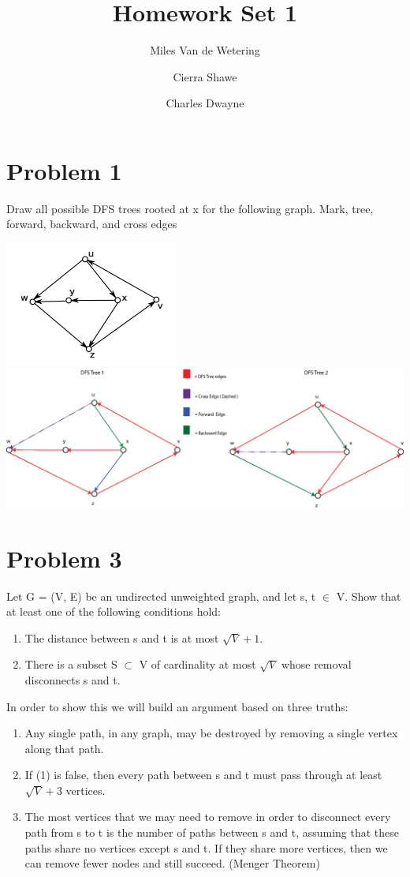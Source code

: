 \documentclass[]{report}
\title{Homework Set 1}
\author{Miles Van de Wetering
	\and
	Cierra Shawe
	\and
	Charles Dwayne}
\begin{document}
\maketitle

\section*{Problem 1}
Draw all possible DFS trees rooted at x for the following graph. Mark, tree, forward,
backward, and cross edges
\begin{center}
	\includegraphics[]{hw1_p1_graph.png}
	\includegraphics[]{cs420-hw2.eps}
\end{center}

\section*{Problem 3}
Let G = (V, E) be an undirected unweighted graph, and let s, t $\in$ V. Show that at least one of the following conditions hold:
\begin{enumerate}
	\item The distance between s and t is at most $\sqrt{V} + 1$.
	\item There is a subset S $\subset$ V of cardinality at most $\sqrt{V}$ whose removal disconnects s and t.
\end{enumerate}

In order to show this we will build an argument based on three truths:
\begin{enumerate}
	\item Any single path, in any graph, may be destroyed by removing a single vertex along that path.
	\item If (1) is false, then every path  between s and t must pass through at least $\sqrt{V} + 3$ vertices.
	\item The most vertices that we may need to remove in order to disconnect every path from s to t is the number of paths between s and t, assuming that these paths share no vertices except s and t. If they share more vertices, then we can remove fewer nodes and still succeed. (Menger Theorem)
\end{enumerate}
	\smallskip
	
\end{document}
